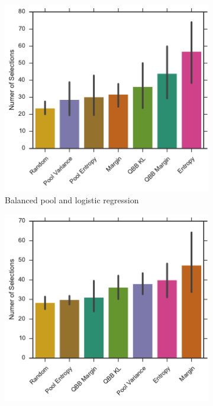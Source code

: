 \begin{figure}[p]
    \centering
    \begin{subfigure}{.5\textwidth}
        \centering
        \includegraphics[width=\textwidth]{figures/5_thompson/vstatlas_bl_no_selections}
        \caption{Balanced pool and logistic regression}
        \label{fig:sdss_bl_no_selections}
    \end{subfigure}%
    \begin{subfigure}{.5\textwidth}
        \centering
        \includegraphics[width=\linewidth]{figures/5_thompson/sdss_br_no_selections}

\end{subfigure}
\end{figure}

